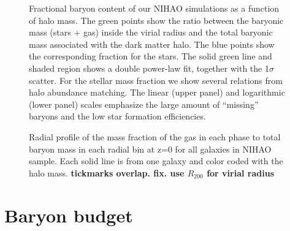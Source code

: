 \documentclass[useAMS,usenatbib]{mn2e}
\begin{document}


\begin{figure}
\centerline{
}
\caption{Fractional baryon content of our NIHAO simulations  as a
  function of halo mass. The green points show the ratio between the
  baryonic mass (stars + gas) inside the virial radius and the total
  baryonic mass associated with the dark matter halo. The blue points
  show the corresponding fraction for the stars. The solid green line
  and shaded region shows a double power-law fit, together with the
  1$\sigma$ scatter. For the stellar mass fraction we show several
  relations from halo abundance matching.    The linear (upper panel)
  and logarithmic (lower panel) scales emphasize the large amount of
  ``missing'' baryons and the low star formation efficiencies.}
\label{fig:budget}
\end{figure}

\begin{figure*}
\centerline{
}
\caption{Radial profile of the mass fraction of the gas in each phase
         to total baryon mass in each radial bin 
         at z=0 for all galaxies in NIHAO sample.
         Each solid line is from one galaxy and color coded with
         the halo mass. {\bf tickmarks overlap. fix. use $R_{200}$ for virial radius}}
\label{fig:corona}
\end{figure*}




\section{Baryon budget}
\label{sec:budget}
\end{document}
